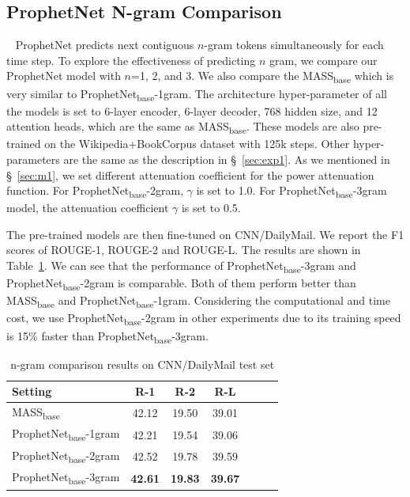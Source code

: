\documentclass[11pt,a4paper]{article}
\begin{document}
\subsection{ProphetNet N-gram Comparison}~\label{sec:exp6}
ProphetNet predicts next contiguous $n$-gram tokens simultaneously for each time step. To explore the effectiveness of predicting $n$ gram, we compare our ProphetNet model with $n$=1, 2, and 3. 
We also compare the MASS\textsubscript{base} which is very similar to ProphetNet\textsubscript{base}-1gram.  The architecture hyper-parameter of all the models is set to 6-layer encoder, 6-layer decoder, 768 hidden size, and 12 attention heads, which are the same as MASS\textsubscript{base}. These models are also pre-trained on the Wikipedia+BookCorpus dataset with 125k steps. Other hyper-parameters are the same as the description in \S~\ref{sec:exp1}. As we mentioned in \S~\ref{sec:m1}, we set different attenuation coefficient for the power attenuation function. For ProphetNet\textsubscript{base}-2gram, $\gamma$ is set to 1.0. For ProphetNet\textsubscript{base}-3gram model, the attenuation coefficient $\gamma$ is set to 0.5.

The pre-trained models are then fine-tuned on CNN/DailyMail.
We report the F1 scores of ROUGE-1, ROUGE-2 and ROUGE-L. The results are shown in Table~\ref{tab:abngram}. We can see that the performance of ProphetNet\textsubscript{base}-3gram and ProphetNet\textsubscript{base}-2gram is comparable. Both of them perform better than MASS\textsubscript{base} and ProphetNet\textsubscript{base}-1gram. Considering the computational and time cost, we use ProphetNet\textsubscript{base}-2gram in other experiments due to its training speed is 15\% faster than ProphetNet\textsubscript{base}-3gram.

\begin{table}[ht] 
\small
\begin{center}
  \begin{tabular}{lcccccl}
    \toprule
    Setting & R-1 & R-2 & R-L \\
    \midrule
 MASS\textsubscript{base}& 42.12 &19.50&   39.01\\
  ProphetNet\textsubscript{base}-1gram &   42.21  & 19.54   &39.06\\
 ProphetNet\textsubscript{base}-2gram &   42.52  & 19.78   &39.59\\
 ProphetNet\textsubscript{base}-3gram & \textbf{42.61}    & \textbf{19.83} &   \textbf{39.67}\\
  \bottomrule
\end{tabular}
\end{center}
\caption{n-gram comparison results on CNN/DailyMail test set}
\label{tab:abngram}
\end{table}
\end{document}
